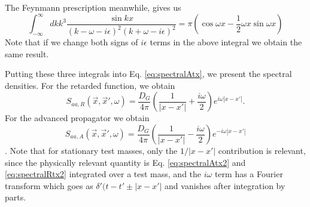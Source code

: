 \documentclass[aps,preprintnumbers,superscriptaddress,longbibliography]{revtex4-1}
\begin{document}
The Feynmann prescription meanwhile, gives us
\begin{equation}
    \int^{\infty}_{-\infty} dk k^3 \frac{\sin{kx}}{(k-\omega-i\epsilon)^2(k+\omega-i\epsilon)^2}=\pi \left(\cos{\omega x} -\frac{1}{2}\omega x \sin{\omega x}\right)
    \label{eq:someieps}
\end{equation}
Note that if we change both signs of $i \epsilon$ terms in the above integral we obtain the same result.

Putting these three integrals into Eq. \eqref{eq:spectralAtx}, we present the spectral densities. For the retarded function, we obtain 
\begin{equation}
   S_{aa,R}(\vec{x},\vec{x}',\omega)= \frac{D_G}{ 4\pi } \left(\frac{1}{|x-x'|}+\frac{i \omega}{2}\right) e^{i \omega |x-x'|}.
  \label{eq:spectralAtx2}
\end{equation}
For the advanced propagator we obtain
\begin{equation}
 S_{aa,A}(\vec{x},\vec{x}',\omega)= \frac{D_G}{ 4\pi }\left( \frac{1}{|x-x'|}-\frac{i \omega}{2} \right)e^{-i \omega |x-x'|}
\label{eq:spectralRtx2}
\end{equation}.
Note that for stationary test masses, only the $1/|x-x'|$ contribution is relevant, since the physically relevant quantity is Eq. \eqref{eq:spectralAtx2}  and \eqref{eq:spectralRtx2} integrated over a test mass, and the $i\omega$ term has a Fourier transform which goes as $\delta'(t-t'\pm |x-x'|$ and vanishes after integration by parts.



%
\end{document}

